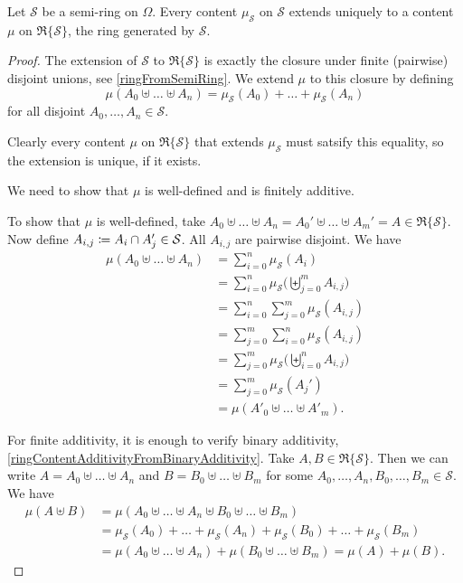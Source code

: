 \begin{lemma} \label{contentsOnSemiRingToRing}
Let $\mathcal{S}$ be a semi-ring on $\Omega$. Every content $\mu_\mathcal{S}$ on $\mathcal{S}$ extends uniquely to a content $\mu$ on $\mathfrak{R}\{\mathcal{S}\}$, the ring generated by $\mathcal{S}$.
\end{lemma}
\begin{proof}
The extension of $\mathcal{S}$ to $\mathfrak{R}\{\mathcal{S}\}$ is exactly the closure under finite (pairwise) disjoint unions, see \ref{ringFromSemiRing}. We extend $\mu$ to this closure by defining
\[ \mu(A_0\uplus \ldots \uplus A_n) = \mu_\mathcal{S}(A_0) + \ldots + \mu_\mathcal{S}(A_n) \]
for all disjoint $A_0, \ldots, A_n\in \mathcal{S}$. 

Clearly every content $\mu$ on $\mathfrak{R}\{\mathcal{S}\}$ that extends $\mu_\mathcal{S}$ must satsify this equality, so the extension is unique, if it exists.

We need to show that $\mu$ is well-defined and is finitely additive.

To show that $\mu$ is well-defined, take $A_0\uplus \ldots \uplus A_n = A_0'\uplus \ldots \uplus A_m' = A \in \mathfrak{R}\{\mathcal{S}\}$. Now define $A_{i,j} \coloneqq A_{i} \cap A_j' \in \mathcal{S}$. All $A_{i,j}$ are pairwise disjoint. We have
\begin{align*}
\mu(A_0\uplus \ldots \uplus A_n) &= \sum_{i=0}^n\mu_\mathcal{S}(A_i) \\
&= \sum_{i=0}^n\mu_\mathcal{S}\Big(\biguplus_{j=0}^m A_{i,j}\Big) \\
&= \sum_{i=0}^n \sum_{j=0}^m\mu_\mathcal{S}(A_{i,j}) \\
&= \sum_{j=0}^m\sum_{i=0}^n\mu_\mathcal{S}(A_{i,j}) \\
&= \sum_{j=0}^m\mu_\mathcal{S}\Big(\biguplus_{i=0}^n A_{i,j}\Big) \\
&= \sum_{j=0}^m\mu_\mathcal{S}(A_j') \\
&= \mu(A'_0\uplus \ldots \uplus A'_m).
\end{align*}

For finite additivity, it is enough to verify binary additivity, \ref{ringContentAdditivityFromBinaryAdditivity}. Take $A, B \in \mathfrak{R}\{\mathcal{S}\}$. Then we can write $A = A_0\uplus \ldots \uplus A_n$ and $B = B_0\uplus \ldots \uplus B_m$ for some $A_0,\ldots, A_n, B_0, \ldots, B_m \in \mathcal{S}$. We have
\begin{align*}
\mu(A\uplus B) &= \mu(A_0 \uplus \ldots \uplus A_n \uplus B_0 \uplus \ldots \uplus B_m) \\
&= \mu_\mathcal{S}(A_0) + \ldots + \mu_\mathcal{S}(A_n) + \mu_\mathcal{S}(B_0) + \ldots + \mu_\mathcal{S}(B_m) \\
&= \mu(A_0 \uplus \ldots \uplus A_n) + \mu(B_0 \uplus \ldots \uplus B_m) = \mu(A) + \mu(B). 
\end{align*}
\end{proof}


